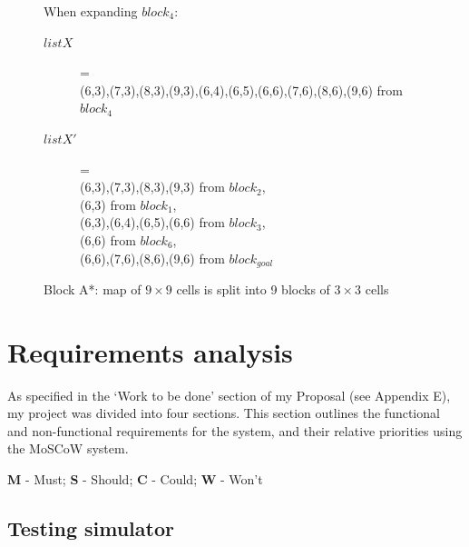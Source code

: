 \documentclass[12pt,twoside,notitlepage]{report}
\begin{document}
\begin{figure}[h]
\begin{center}
  \end{center}
 
\noindent 
When expanding $block_{4}$:
\begin{description}
\item[$listX$] = \\ \hfill (6,3),(7,3),(8,3),(9,3),(6,4),(6,5),(6,6),(7,6),(8,6),(9,6) from $block_{4}$\\
\item[$listX'$] = \\ \hfill (6,3),(7,3),(8,3),(9,3) from $block_{2}$,\\ (6,3) from $block_{1}$,\\ (6,3),(6,4),(6,5),(6,6) from $block_{3}$,\\ (6,6) from $block_{6}$,\\ (6,6),(7,6),(8,6),(9,6) from $block_{goal}$
\end{description}

  \caption{Block A*: map of {$ 9 \times 9$} cells is split into 9 blocks of {$ 3 \times 3$} cells} 
  \label{fig:lineofsight}
\end{figure}


\clearpage
\section {Requirements analysis}

As specified in the `Work to be done' section of my Proposal (see Appendix E), my project was divided into four sections. This section outlines the functional and non-functional requirements for the system, and their relative priorities using the MoSCoW system. \\
\centerline {{\bf M} - Must; {\bf S} - Should; {\bf C} - Could; {\bf W} - Won't}

\subsection{Testing simulator}
\end{document}
